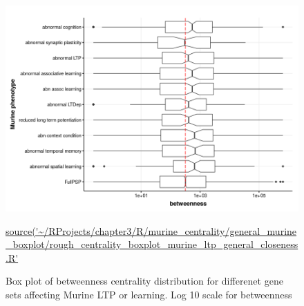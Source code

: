 \begin{figure}
    \centering
    \includegraphics[width=\textwidth]{images/chapter3/ggplot2/murine_centrality_boxplot/add_theme/addLTP/Rplot_betweenness_edit.png}
    \caption{Box plot of betweenness centrality distribution for differenet gene sets affecting Murine LTP or learning. Log 10 scale for betweenness} 
    \tiny\url{source('~/RProjects/chapter3/R/murine_centrality/general_murine_boxplot/rough_centrality_boxplot_murine_ltp_general_closeness.R'}
    \label{fig:murine_ltp_centrality_boxplot_betweenness}
\end{figure}

